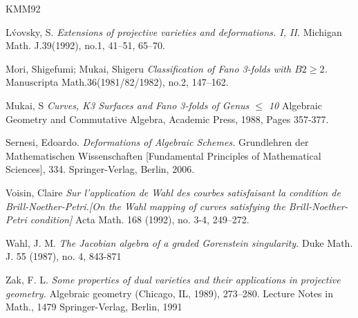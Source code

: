 \documentclass[11pt,twoside]{amsart}
\theoremstyle{plain}
\numberwithin{equation}{section}
\theoremstyle{definition}
\begin{document}
\begin{thebibliography}{KMM92}

L\'vovsky, S.
\emph{Extensions of projective varieties and deformations. I, II.}
Michigan Math. J.39(1992), no.1, 41–51, 65--70.





Mori, Shigefumi; Mukai, Shigeru
\emph{Classification of Fano 3-folds with $B2 \geq 2$.}
Manuscripta Math.36(1981/82/1982), no.2, 147–162.


Mukai, S
\emph{Curves, K3 Surfaces and Fano 3-folds of Genus $\leq$ 10}
Algebraic Geometry and Commutative Algebra, Academic Press,
1988, Pages 357-377.

  \color{black}
  


  \color{black}








Sernesi, Edoardo.
\emph{Deformations of Algebraic Schemes.}
Grundlehren der Mathematischen Wissenschaften [Fundamental Principles of Mathematical Sciences], 334. Springer-Verlag, Berlin, 2006.





Voisin, Claire
\emph{Sur l'application de Wahl des courbes satisfaisant la condition de Brill-Noether-Petri.[On the Wahl mapping of curves satisfying the Brill-Noether-Petri condition]}
Acta Math. 168 (1992), no. 3-4, 249–272.






Wahl, J. M. 
\emph{The Jacobian algebra of a graded Gorenstein singularity.}
Duke Math. J. 55 (1987), no. 4,
843-871

Zak, F. L.
\emph{Some properties of dual varieties and their applications in projective geometry.}
Algebraic geometry (Chicago, IL, 1989), 273–280.
Lecture Notes in Math., 1479
Springer-Verlag, Berlin, 1991

 






  

\end{thebibliography}
\end{document}
